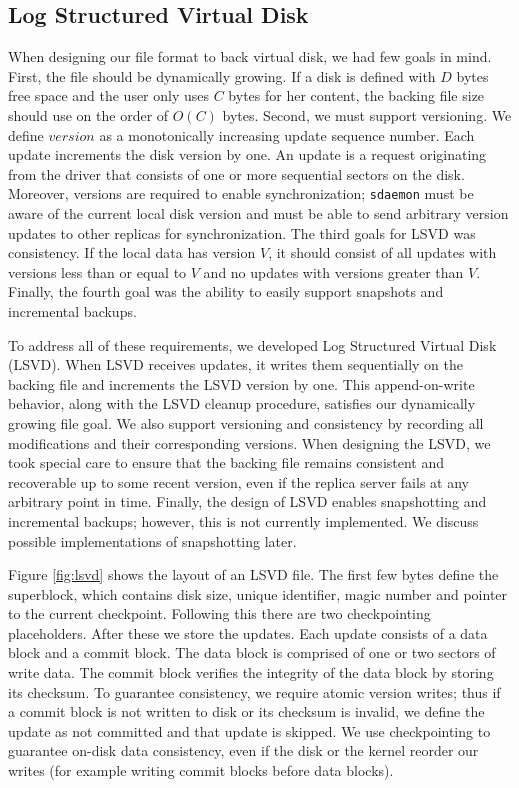 \subsection{Log Structured Virtual Disk}
\label{sec:lsvd}

When designing our file format to back virtual disk, we had few goals in mind. First, the file should be dynamically growing. If a disk is defined with $D$ bytes free space and the user only uses $C$ bytes for her content, the backing file size should use on the order of $O(C)$ bytes. Second, we must support versioning. We define $version$ as a monotonically increasing update sequence number. Each update increments the disk version by one. An update is a request originating from the driver that consists of one or more sequential sectors on the disk. Moreover, versions are required to enable synchronization; \texttt{sdaemon} must be aware of the current local disk version and must be able to send arbitrary version updates to other replicas for synchronization. The third goals for LSVD was consistency. If the local data has version $V$, it should consist of all updates with versions less than or equal to $V$ and no updates with versions greater than $V$. Finally, the fourth goal was the ability to easily support snapshots and incremental backups.

To address all of these requirements, we developed Log Structured Virtual Disk (LSVD). When LSVD receives updates, it writes them sequentially on the backing file and increments the LSVD version by one. This append-on-write behavior, along with the LSVD cleanup procedure, satisfies our dynamically growing file goal. We also support versioning and consistency by recording all modifications and their corresponding versions. When designing the LSVD, we took special care to ensure that the backing file remains consistent and recoverable up to some recent version, even if the replica server fails at any arbitrary point in time. Finally, the design of LSVD enables snapshotting and incremental backups; however, this is not currently implemented. We discuss possible implementations of snapshotting later.

Figure \ref{fig:lsvd} shows the layout of an LSVD file. The first few bytes define the superblock, which contains disk size, unique identifier, magic number and pointer to the current checkpoint. Following this there are two checkpointing placeholders. After these we store the updates. Each update consists of a data block and a commit block. The data block is comprised of one or two sectors of write data. The commit block verifies the integrity of the data block by storing its checksum. To guarantee consistency, we require atomic version writes; thus if a commit block is not written to disk or its checksum is invalid, we define the update as not committed and that update is skipped. We use checkpointing to guarantee on-disk data consistency, even if the disk or the kernel reorder our writes (for example writing commit blocks before data blocks).

